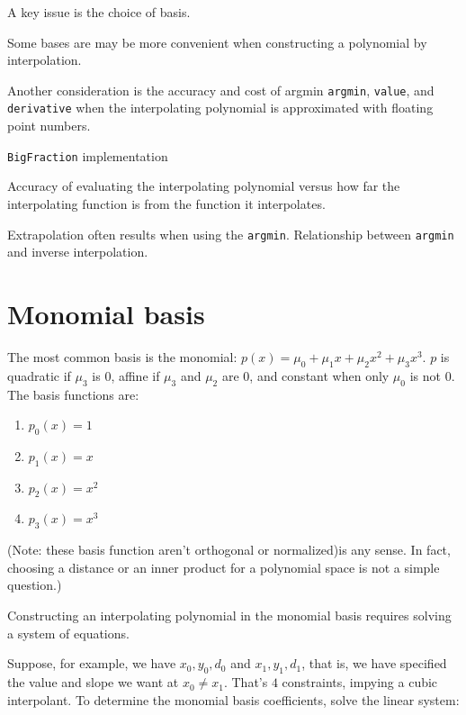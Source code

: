 A key issue is the choice of basis.

Some bases are may be more convenient when constructing a 
polynomial by interpolation.

Another consideration is the accuracy and cost of 
argmin \texttt{argmin}, \texttt{value}, and \texttt{derivative} 
when the interpolating polynomial is approximated with 
floating point numbers.

\texttt{BigFraction} implementation

Accuracy of evaluating the interpolating polynomial
versus how far the interpolating function is from the function it
interpolates.

Extrapolation often results when using the \texttt{argmin}.
Relationship between \texttt{argmin} and inverse interpolation.

\section{Monomial basis}\label{sec:monomial-basis}

The most common basis is the monomial:
$p(x) = \mu_0 + \mu_1 x + \mu_2 x^2 + \mu_3 x^3$.
$p$ is quadratic if $\mu_3$ is $0$,
affine if $\mu_3$ and $\mu_2$ are $0$,
and constant when only $\mu_0$ is not $0$.
The basis functions are:
\begin{enumerate}[start=0]
 \item $p_0(x) = 1$
 \item $p_1(x) = x$
 \item $p_2(x) = x^2$
 \item $p_3(x) = x^3$
\end{enumerate}

(Note: these basis function aren't orthogonal or normalized)is any
sense. In fact, choosing a distance or an inner product for
a polynomial space is not a simple question.)

Constructing an interpolating polynomial in the monomial basis
requires solving a system of equations.

Suppose, for example, we have $x_0,y_0,d_0$ and
$x_1,y_1,d_1$, that is, we have specified the value and slope we
want at $x_0 \neq x_1$.
That's $4$ constraints, impying a cubic interpolant.
To determine the monomial basis coefficients,
solve the linear system:

